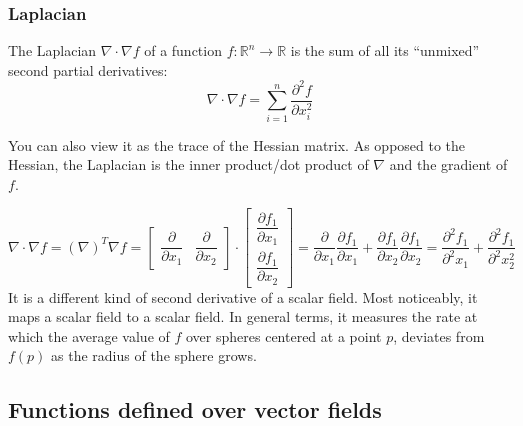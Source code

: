\documentclass{article}
\begin{document}
\subsubsection{Laplacian}
The Laplacian $\nabla \cdot \nabla f$ of a function $ f: \mathbb{R}^n
\longrightarrow \mathbb{R}$ is the sum of all its ``unmixed'' second partial
derivatives:
\[
\nabla \cdot \nabla f = \sum_{i=1}^n \frac {\partial^2 f}{\partial x^2_i}
\]

You can also view it as the trace of the Hessian matrix. As opposed to the
Hessian, the Laplacian is the inner product/dot product of $\nabla$
and the gradient of $f$.

\[
\nabla \cdot \nabla f = (\nabla)^T \nabla{f} = 
    \begin{bmatrix}
        \dfrac{\partial }{\partial x_1} & 
        \dfrac{\partial }{\partial x_2}
    \end{bmatrix} \cdot
    \begin{bmatrix}
        \dfrac{\partial f_1}{\partial x_1} \\
        \dfrac{\partial f_1}{\partial x_2}
    \end{bmatrix} =
    \dfrac{\partial }{\partial x_1} \dfrac{\partial f_1}{\partial x_1} +
    \dfrac{\partial f_1}{\partial x_2} \dfrac{\partial f_1}{\partial x_2} = 
    \dfrac{\partial^2 f_1}{\partial^2 x_1} + \dfrac{\partial^2 f_1}{\partial^2 x_2^2}
\]
It is a different kind of second derivative of a scalar field. Most noticeably,
it maps a scalar field to a scalar field. In general terms, it measures the rate at
which the average value of $f$ over spheres centered at a point $p$, deviates
from $f(p)$ as the radius of the sphere grows.

\subsection{Functions defined over vector fields}
\end{document}
